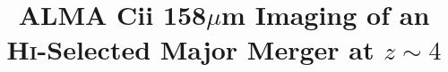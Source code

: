 \documentclass[twocolumn]{aastex62}
\begin{document}

\title{ALMA C{\sc ii} 158$\mu$m Imaging of an H{\textsc i}-Selected Major Merger at $z \sim 4$}


\end{document}

